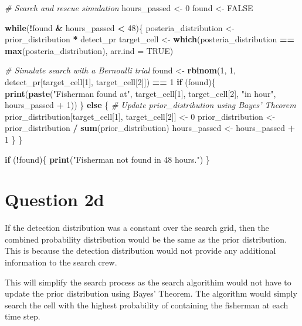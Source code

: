 \documentclass[
]{article}
\newenvironment{Shaded}{\begin{snugshade}}{\end{snugshade}}
\newcommand{\AttributeTok}[1]{\textcolor[rgb]{0.13,0.29,0.53}{#1}}
\newcommand{\CommentTok}[1]{\textcolor[rgb]{0.56,0.35,0.01}{\textit{#1}}}
\newcommand{\ConstantTok}[1]{\textcolor[rgb]{0.56,0.35,0.01}{#1}}
\newcommand{\ControlFlowTok}[1]{\textcolor[rgb]{0.13,0.29,0.53}{\textbf{#1}}}
\newcommand{\DecValTok}[1]{\textcolor[rgb]{0.00,0.00,0.81}{#1}}
\newcommand{\FunctionTok}[1]{\textcolor[rgb]{0.13,0.29,0.53}{\textbf{#1}}}
\newcommand{\NormalTok}[1]{#1}
\newcommand{\OtherTok}[1]{\textcolor[rgb]{0.56,0.35,0.01}{#1}}
\newcommand{\SpecialCharTok}[1]{\textcolor[rgb]{0.81,0.36,0.00}{\textbf{#1}}}
\newcommand{\StringTok}[1]{\textcolor[rgb]{0.31,0.60,0.02}{#1}}
\begin{document}
\begin{Shaded}
\begin{Highlighting}[]
\CommentTok{\# Search and rescue simulation}
\NormalTok{hours\_passed }\OtherTok{\textless{}{-}} \DecValTok{0}
\NormalTok{found }\OtherTok{\textless{}{-}} \ConstantTok{FALSE}

\ControlFlowTok{while}\NormalTok{(}\SpecialCharTok{!}\NormalTok{found }\SpecialCharTok{\&}\NormalTok{ hours\_passed }\SpecialCharTok{\textless{}} \DecValTok{48}\NormalTok{)\{}
\NormalTok{  posteria\_distribution }\OtherTok{\textless{}{-}}\NormalTok{ prior\_distribution }\SpecialCharTok{*}\NormalTok{ detect\_pr}
\NormalTok{  target\_cell }\OtherTok{\textless{}{-}} \FunctionTok{which}\NormalTok{(posteria\_distribution }\SpecialCharTok{==} \FunctionTok{max}\NormalTok{(posteria\_distribution), }\AttributeTok{arr.ind =} \ConstantTok{TRUE}\NormalTok{)}
  
  \CommentTok{\# Simulate search with a Bernoulli trial}
\NormalTok{  found }\OtherTok{\textless{}{-}} \FunctionTok{rbinom}\NormalTok{(}\DecValTok{1}\NormalTok{, }\DecValTok{1}\NormalTok{, detect\_pr[target\_cell[}\DecValTok{1}\NormalTok{], target\_cell[}\DecValTok{2}\NormalTok{]]) }\SpecialCharTok{==} \DecValTok{1}
  \ControlFlowTok{if}\NormalTok{ (found)\{}
    \FunctionTok{print}\NormalTok{(}\FunctionTok{paste}\NormalTok{(}\StringTok{"Fisherman found at"}\NormalTok{, target\_cell[}\DecValTok{1}\NormalTok{], target\_cell[}\DecValTok{2}\NormalTok{], }\StringTok{"in hour"}\NormalTok{, hours\_passed }\SpecialCharTok{+} \DecValTok{1}\NormalTok{))}
\NormalTok{  \} }\ControlFlowTok{else}\NormalTok{ \{}
    \CommentTok{\# Update prior\_distribution using Bayes’ Theorem}
\NormalTok{    prior\_distribution[target\_cell[}\DecValTok{1}\NormalTok{], target\_cell[}\DecValTok{2}\NormalTok{]] }\OtherTok{\textless{}{-}} \DecValTok{0}
\NormalTok{    prior\_distribution }\OtherTok{\textless{}{-}}\NormalTok{ prior\_distribution }\SpecialCharTok{/} \FunctionTok{sum}\NormalTok{(prior\_distribution)}
\NormalTok{    hours\_passed }\OtherTok{\textless{}{-}}\NormalTok{ hours\_passed }\SpecialCharTok{+} \DecValTok{1}
\NormalTok{  \}}
\NormalTok{\}}

\ControlFlowTok{if}\NormalTok{ (}\SpecialCharTok{!}\NormalTok{found)\{}
  \FunctionTok{print}\NormalTok{(}\StringTok{"Fisherman not found in 48 hours."}\NormalTok{)}
\NormalTok{\}}
\end{Highlighting}
\end{Shaded}

\hypertarget{question-2d}{%
\section{Question 2d}\label{question-2d}}

If the detection distribution was a constant over the search grid, then
the combined probability distribution would be the same as the prior
distribution. This is because the detection distribution would not
provide any additional information to the search crew.

This will simplify the search process as the search algorithim would not
have to update the prior distribution using Bayes' Theorem. The
algorithm would simply search the cell with the highest probability of
containing the fisherman at each time step.
\end{document}
